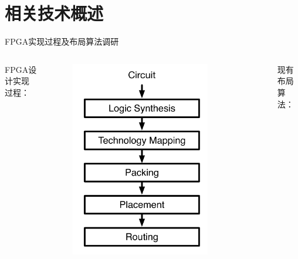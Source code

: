 \documentclass[10pt]{beamer}
\begin{document}
\section{相关技术概述}

\begin{frame}{FPGA实现过程及布局算法调研}

  \begin{columns}[T, onlytextwidth]
    FPGA设计实现过程：
      \begin{figure}
        \includegraphics[width=0.8\textwidth]{img/cad.png}
      \end{figure}

      现有布局算法：


\end{columns}
\end{frame}
\end{document}
